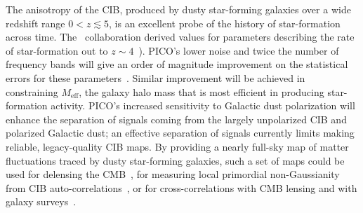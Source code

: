 \documentclass[PICOReport.tex]{subfiles}
\begin{document}
The anisotropy of the \ac{CIB}, produced by dusty star-forming galaxies over a wide redshift range $0 < z \lesssim 5$, is an excellent probe of the history of star-formation across time. The \planck\ collaboration derived values for parameters describing the rate of star-formation out to $z\sim4$~\cite{2014A&A...571A..30P,2014A&A...571A..18P,madau2014}). PICO's lower noise and twice the number of frequency bands will give an order of magnitude improvement on the statistical errors for these parameters~\cite{Wu:2016hej}. Similar improvement will be achieved in constraining $M_{\mathrm{eff}}$, the galaxy halo mass that is most efficient in producing star-formation activity. PICO's increased sensitivity to Galactic dust polarization will enhance the separation of signals coming from the largely unpolarized \ac{CIB} and polarized Galactic dust; an effective separation of signals currently limits making reliable, legacy-quality \ac{CIB} maps. 
By providing a nearly full-sky map of matter fluctuations traced by dusty star-forming galaxies, such a set of maps could be used for delensing the CMB~\cite{Sherwin/Schmittfull}, for measuring local primordial non-Gaussianity from \ac{CIB} auto-correlations~\cite{tucci}, or for cross-correlations with CMB lensing and with galaxy surveys~\cite{Schmittfull/Seljak}.
\end{document}
